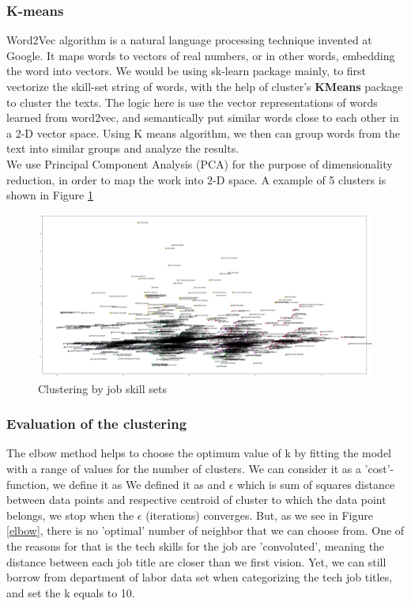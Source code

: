 \subsubsection{K-means}
Word2Vec algorithm is a natural language processing technique invented at Google. It maps words to vectors of real numbers, or in other words, embedding the word into vectors. We would be using sk-learn package mainly, to first vectorize the skill-set string of words, with the help of cluster's \textbf{KMeans} package to cluster the texts. The logic here is use the vector representations of words learned from word2vec, and semantically put similar words close to each other in a 2-D vector space. Using K means algorithm, we then can group words from the text into similar groups and analyze the results.\\
We  use Principal Component Analysis (PCA) for the purpose of  dimensionality reduction, in order to map the work into 2-D space. A example of 5 clusters is shown in Figure \ref{pca} 
\begin{figure}[h]
	\begin{center}
		\includegraphics[width=.9\linewidth]{./photos/clusterscatter.png}
	\end{center}
	\caption{Clustering by job skill sets}
	\label{pca}
\end{figure}
\subsubsection{Evaluation of the clustering}
The elbow method helps to choose the optimum value of k by fitting the model with a range of values for the number of clusters. We can consider it as a 'cost'-function, we define it as We defined it  as and $\epsilon$ which is sum of squares  distance between data points and respective centroid of cluster to which the data point belongs, we stop when the $\epsilon$ (iterations) converges. But, as we see in Figure \ref{elbow}, there is no 'optimal' number of neighbor that we can choose from. One of the reasons for that is the tech skills for the job are 'convoluted', meaning the distance between each job title are closer than we first vision. Yet, we can still borrow from department of labor data set when categorizing the tech job titles, and set the k equals to 10.

